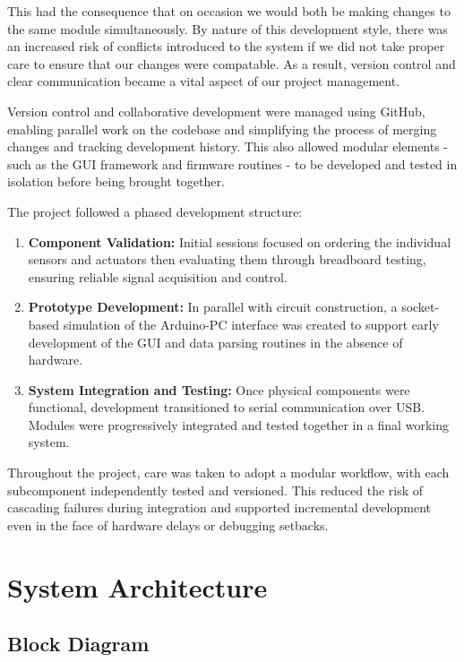 \documentclass[a4paper,11pt]{article}
\begin{document}
This had the consequence that on occasion we would 
both be making changes to the same module simultaneously.
By nature of this development style,
there was an increased risk of conflicts introduced to the system
if we did not take proper care to ensure that our changes were compatable.
As a result, version control and clear communication 
became a vital aspect of our project management.

Version control and collaborative development were managed using GitHub, 
enabling parallel work on the codebase
and simplifying the process of merging changes and tracking development history. 
This also allowed modular elements - 
such as the GUI framework and firmware routines -
to be developed and tested in isolation before being brought together.

The project followed a phased development structure:
\begin{enumerate}[nosep]
    \item \textbf{Component Validation:} 
    Initial sessions focused on ordering the individual sensors 
    and actuators then evaluating them through breadboard testing, 
    ensuring reliable signal acquisition and control.
    \item \textbf{Prototype Development:} 
    In parallel with circuit construction, a socket-based simulation 
    of the Arduino-PC interface was created to support 
    early development of the GUI and data parsing routines 
    in the absence of hardware.
    \item \textbf{System Integration and Testing:} 
    Once physical components were functional, development transitioned 
    to serial communication over USB. 
    Modules were progressively integrated and tested together 
    in a final working system.
\end{enumerate}

Throughout the project, care was taken to adopt a modular workflow, 
with each subcomponent independently tested and versioned. 
This reduced the risk of cascading failures during integration and 
supported incremental development even in the face of hardware delays 
or debugging setbacks.

\section{System Architecture}
\label{sec:architecture}

\subsection{Block Diagram}
\label{sec:block_diagram}
\end{document}
